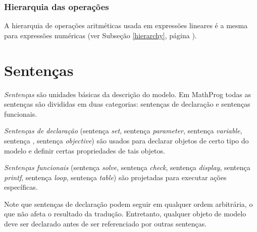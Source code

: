 \documentclass[11pt, brazil]{report}
\begin{document}
%

\subsection{Hierarquia das operações}

A hierarquia de operações aritméticas usada em expressões lineares é a mesma
para expressões numéricas (ver Subseção \ref{hierarchy}, página \pageref{hierarchy}).



\chapter{Sentenças}

{\it Sentenças} são unidades básicas da descrição do modelo. Em MathProg
todas as sentenças são divididas em duas categorias: sentenças de declaração
e sentenças funcionais.

{\it Sentenças de declaração} (sentença {\it set}, sentença {\it parameter},
sentença {\it variable}, sentença , sentença {\it objective}) são
usados para declarar objetos de certo tipo do modelo e definir certas propriedades
de tais objetos.

{\it Sentenças funcionais} (sentença {\it solve}, sentença {\it check},
sentença {\it display}, sentença {\it printf}, sentença {\it loop}, sentença
{\it table}) são projetadas para executar ações específicas.

Note que sentenças de declaração podem seguir em qualquer ordem arbitrária,
o que não afeta o resultado da tradução. Entretanto, qualquer objeto de modelo
deve ser declarado antes de ser referenciado por outras sentenças.
\end{document}
